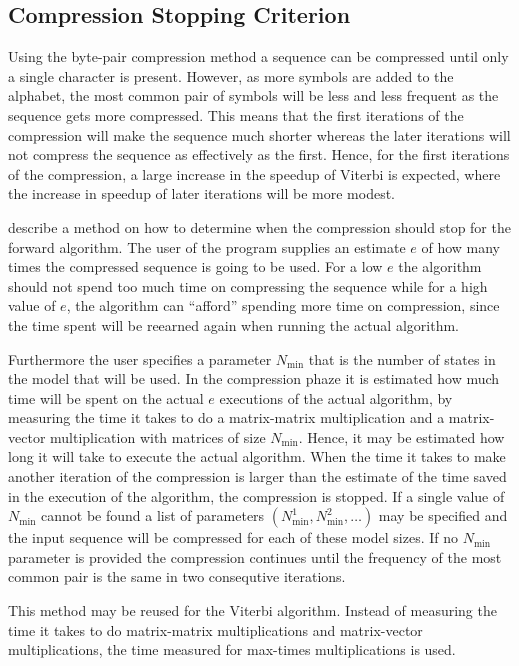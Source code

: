 \subsection{Compression Stopping Criterion}
\label{sec:compr-stopp-crit}

Using the byte-pair compression method a sequence can be compressed until only
a single character is present. However, as more symbols are added to the
alphabet, the most common pair of symbols will be less and less frequent as the
sequence gets more compressed. This means that the first iterations of the
compression will make the sequence much shorter whereas the later iterations
will not compress the sequence as effectively as the first. Hence, for the
first iterations of the compression, a large increase in the speedup of Viterbi
is expected, where the increase in speedup of later iterations will be more
modest.

\citet{sand2013ziphmmlib} describe a method on how to determine when the
compression should stop for the forward algorithm. The user of the program
supplies an estimate $e$ of how many times the compressed sequence is going to
be used. For a low $e$ the algorithm should not spend too much time on
compressing the sequence while for a high value of $e$, the algorithm can
``afford'' spending more time on compression, since the time spent will be
reearned again when running the actual algorithm.

Furthermore the user specifies a parameter $N_{\text{min}}$ that is the number
of states in the model that will be used. In the compression phaze it is
estimated how much time will be spent on the actual $e$ executions of the
actual algorithm, by measuring the time it takes to do a matrix-matrix
multiplication and a matrix-vector multiplication with matrices of size
$N_{\text{min}}$. Hence, it may be estimated how long it will take to execute
the actual algorithm. When the time it takes to make another iteration of the
compression is larger than the estimate of the time saved in the execution of
the algorithm, the compression is stopped. If a single value of
$N_{\text{min}}$ cannot be found a list of parameters
$(N_{\text{min}}^1, N_{\text{min}}^2, \dots)$ may be specified and the input
sequence will be compressed for each of these model sizes. If no
$N_{\text{min}}$ parameter is provided the compression continues until the
frequency of the most common pair is the same in two consequtive iterations.

This method may be reused for the Viterbi algorithm. Instead of measuring the
time it takes to do matrix-matrix multiplications and matrix-vector
multiplications, the time measured for max-times multiplications is used.

